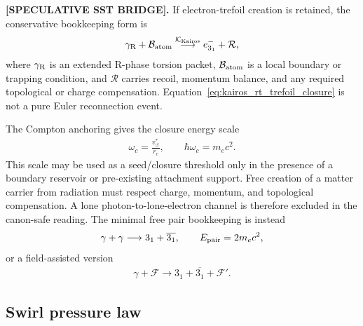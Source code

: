 \documentclass[11pt]{article}
\theoremstyle{definition}
\theoremstyle{plain}
\theoremstyle{remark}
\newcommand{\rc}{{r_c}}
\newcommand{\vchar}{v_{\!\boldsymbol{\circlearrowleft}}^{\ast}}
\begin{document}
        \textbf{[SPECULATIVE SST BRIDGE].}
        If electron-trefoil creation is retained, the conservative bookkeeping
        form is
        \begin{align}
            \gamma_{\rm R}
            +
            \mathcal{B}_{\rm atom}
            \overset{\mathcal{K}_{\rm Kairos}}{\longrightarrow}
            e^-_{3_1}
            +
            \mathcal{R},
            \label{eq:kairos_rt_trefoil_closure}
        \end{align}
        where \(\gamma_{\rm R}\) is an extended R-phase torsion packet,
        \(\mathcal{B}_{\rm atom}\) is a local boundary or trapping condition, and
        \(\mathcal{R}\) carries recoil, momentum balance, and any required
        topological or charge compensation. Equation~\eqref{eq:kairos_rt_trefoil_closure}
        is not a pure Euler reconnection event.

        The Compton anchoring gives the closure energy scale
        \begin{align}
            \omega_c = \frac{\vchar}{\rc},
            \qquad
            \hbar\omega_c = m_e c^2.
            \label{eq:compton_closure_energy_scale}
        \end{align}
        This scale may be used as a seed/closure threshold only in the presence
        of a boundary reservoir or pre-existing attachment support. Free creation
        of a matter carrier from radiation must respect charge, momentum, and
        topological compensation. A lone photon-to-lone-electron channel is
        therefore excluded in the canon-safe reading. The minimal free pair
        bookkeeping is instead
        \begin{align}
            \gamma+\gamma
            \longrightarrow
            3_1+\overline{3_1},
            \qquad
            E_{\rm pair}=2m_e c^2,
            \label{eq:trefoil_antitrefoil_pair_bookkeeping}
        \end{align}
        or a field-assisted version
        \begin{align}
            \gamma+\mathcal{F}
            \longrightarrow
            3_1+\overline{3_1}+\mathcal{F}' .
            \label{eq:field_assisted_pair_bookkeeping}
        \end{align}

    \subsection{Swirl pressure law}
        \label{subsec:swirl_pressure_law}
\end{document}
